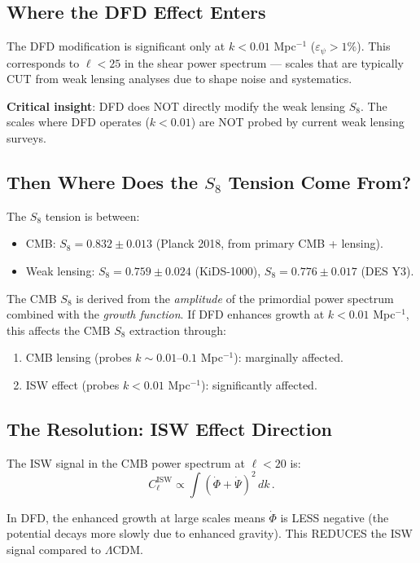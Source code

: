 \documentclass[11pt,a4paper]{article}
\begin{document}
\subsection{Where the DFD Effect Enters}

The DFD modification is significant only at $k < 0.01$ Mpc$^{-1}$ ($\varepsilon_\psi > 1\%$). This corresponds to $\ell < 25$ in the shear power spectrum --- scales that are typically CUT from weak lensing analyses due to shape noise and systematics.

\textbf{Critical insight}: DFD does NOT directly modify the weak lensing $S_8$. The scales where DFD operates ($k < 0.01$) are NOT probed by current weak lensing surveys.

\subsection{Then Where Does the $S_8$ Tension Come From?}

The $S_8$ tension is between:
\begin{itemize}
\item CMB: $S_8 = 0.832 \pm 0.013$ (Planck 2018, from primary CMB + lensing).
\item Weak lensing: $S_8 = 0.759 \pm 0.024$ (KiDS-1000), $S_8 = 0.776 \pm 0.017$ (DES Y3).
\end{itemize}

The CMB $S_8$ is derived from the \emph{amplitude} of the primordial power spectrum combined with the \emph{growth function}. If DFD enhances growth at $k < 0.01$ Mpc$^{-1}$, this affects the CMB $S_8$ extraction through:
\begin{enumerate}
\item CMB lensing (probes $k \sim 0.01$--$0.1$ Mpc$^{-1}$): marginally affected.
\item ISW effect (probes $k < 0.01$ Mpc$^{-1}$): significantly affected.
\end{enumerate}

\subsection{The Resolution: ISW Effect Direction}

The ISW signal in the CMB power spectrum at $\ell < 20$ is:
\begin{equation}
C_\ell^{\mathrm{ISW}} \propto \int (\dot{\Phi} + \dot{\Psi})^2\,dk\,.
\end{equation}

In DFD, the enhanced growth at large scales means $\dot{\Phi}$ is LESS negative (the potential decays more slowly due to enhanced gravity). This REDUCES the ISW signal compared to $\Lambda$CDM.
\end{document}
